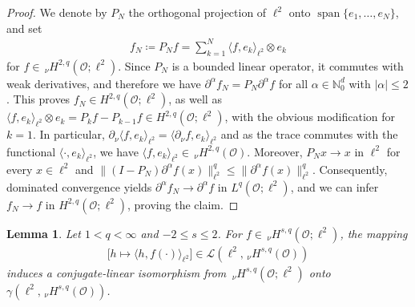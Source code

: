 \documentclass[reqno]{amsart}
\newtheorem{lemma}[Satz]{Lemma}
\newcommand{\sL}{\mathscr{L}}
\newcommand{\sO}{\mathscr{O}}
\newcommand{\1}{\mathbf{1}}
\newcommand{\nH}{\ensuremath{\,_\nu H}}
\newcommand{\bpsn}[1]{\ensuremath{\nH^{#1}(\sO)}}
\newcommand{\Bpsn}[1]{\ensuremath{\nH^{#1}(\sO;\ell^2)}}
\begin{document}
\begin{proof}
We denote by $P_N$ the orthogonal projection of $\ell^2$ onto $\operatorname{span}\{e_1,\dots,e_N\}$, and set
\begin{align*}
    f_N\coloneqq P_N f=
    \sum_{k=1}^N
    \langle f,e_k\rangle_{\ell^2}\otimes e_k
\end{align*}
for $  f\in \nH^{2,q}(\sO;\ell^2)$.
Since $P_N$ is a bounded linear operator, it commutes with weak derivatives, and therefore we have $ 
    \partial^\alpha f_N
    =
    P_N \partial^\alpha f$ 
for all $\alpha \in \mathbb{N}_0^d$ with $|\alpha|\leq 2$. This proves $f_N\in H^{2,q}(\sO;\ell^2)$, as well as  $\langle f,e_k\rangle_{\ell^2}\otimes e_k=P_k f-P_{k-1}f\in H^{2,q}(\sO;\ell^2)$, with the obvious modification for $k=1$.
In particular, 
$\partial_\nu \langle f,e_k\rangle_{\ell^2}=\langle \partial_\nu f,e_k\rangle_{\ell^2}$ and as the trace commutes with the functional $\langle \cdot, e_k \rangle_{\ell^2}$, we have
$\langle f,e_k\rangle_{\ell^2}\in \nH^{2,q}(\sO)$.
Moreover, $P_Nx\to x$ in $\ell^2$ for every $x\in\ell^2$ and
$  \|(I-P_N)\partial^\alpha f(x)\|^q_{\ell^2}
    \leq
    \|\partial^\alpha f(x)\|^q_{\ell^2}$.
Consequently, dominated convergence yields
   $  \partial^\alpha f_N
    \to
    \partial^\alpha f$ in $ 
    L^q(\sO;\ell^2)$,
and we can infer $f_N \to f $ in $H^{2,q}(\sO;\ell^2)$, proving the claim.
\end{proof}


\begin{lemma}\label{handle_noise}
Let $1<q<\infty$ and $-2\leq s\leq 2$. For $f\in \Bpsn{s,q}$, the mapping
\begin{align}\label{linear_mapping}
    \bigl[h\mapsto \langle h,f(\cdot)\rangle_{\ell^2}\bigr] \in \sL(\ell^2,\bpsn{s,q})
\end{align}
induces a conjugate-linear isomorphism from $\Bpsn{s,q}$ onto  $\gamma(\ell^2, \bpsn{s,q}) $.
\end{lemma}    
\end{document}
